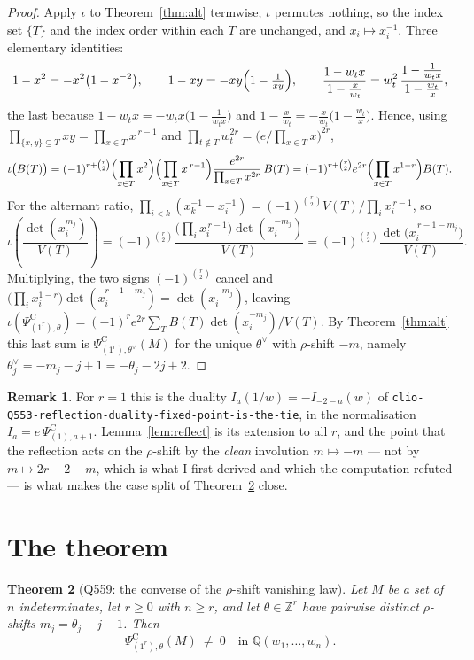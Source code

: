 \documentclass[11pt]{article}
\newtheorem{theorem}{Theorem}
\theoremstyle{definition}
\newtheorem{remark}[theorem]{Remark}
\newcommand{\PsiC}{\Psi^{\mathrm{C}}}
\begin{document}
\begin{proof}
Apply $\iota$ to Theorem~\ref{thm:alt} termwise; $\iota$ permutes nothing, so the index set
$\{T\}$ and the index order within each $T$ are unchanged, and $x_i\mapsto x_i^{-1}$.
Three elementary identities:
\[
  1-x^{2}=-x^{2}\bigl(1-x^{-2}\bigr),\qquad
  1-xy=-xy\Bigl(1-\tfrac{1}{xy}\Bigr),\qquad
  \frac{1-w_tx}{1-\frac{x}{w_t}}=w_t^{2}\,\frac{1-\frac{1}{w_tx}}{1-\frac{w_t}{x}},
\]
the last because $1-w_tx=-w_tx\bigl(1-\frac{1}{w_tx}\bigr)$ and
$1-\frac{x}{w_t}=-\frac{x}{w_t}\bigl(1-\frac{w_t}{x}\bigr)$. Hence, using
$\prod_{\{x,y\}\subseteq T}xy=\prod_{x\in T}x^{\,r-1}$ and
$\prod_{t\notin T}w_t^{2r}=\bigl(e/\prod_{x\in T}x\bigr)^{2r}$,
\[
  \iota\bigl(B(T)\bigr)
  =(-1)^{r+\binom r2}\Bigl(\prod_{x\in T}x^{2}\Bigr)\Bigl(\prod_{x\in T}x^{\,r-1}\Bigr)
   \frac{e^{2r}}{\prod_{x\in T}x^{2r}}\,B(T)
  =(-1)^{r+\binom r2}e^{2r}\Bigl(\prod_{x\in T}x^{1-r}\Bigr)B(T).
\]
For the alternant ratio,
$\prod_{i<k}(x_k^{-1}-x_i^{-1})=(-1)^{\binom r2}V(T)\big/\prod_i x_i^{\,r-1}$, so
\[
  \iota\!\left(\frac{\det(x_i^{m_j})}{V(T)}\right)
  =(-1)^{\binom r2}\frac{\bigl(\prod_ix_i^{\,r-1}\bigr)\det(x_i^{-m_j})}{V(T)}
  =(-1)^{\binom r2}\frac{\det\bigl(x_i^{\,r-1-m_j}\bigr)}{V(T)} .
\]
Multiplying, the two signs $(-1)^{\binom r2}$ cancel and
$\bigl(\prod_ix_i^{1-r}\bigr)\det(x_i^{r-1-m_j})=\det(x_i^{-m_j})$, leaving
$\iota(\PsiC_{(1^r),\theta})=(-1)^re^{2r}\sum_TB(T)\det(x_i^{-m_j})/V(T)$. By
Theorem~\ref{thm:alt} this last sum is $\PsiC_{(1^r),\theta^\vee}(M)$ for the unique
$\theta^\vee$ with $\rho$-shift $-m$, namely $\theta^\vee_j=-m_j-j+1=-\theta_j-2j+2$.
\end{proof}

\begin{remark}
For $r=1$ this is the duality $I_a(1/w)=-I_{-2-a}(w)$ of
\texttt{clio-Q553-reflection-duality-fixed-point-is-the-tie}, in the normalisation
$I_a=e\,\PsiC_{(1),a+1}$. Lemma~\ref{lem:reflect} is its extension to all $r$, and the
point that the reflection acts on the $\rho$-shift by the \emph{clean} involution
$m\mapsto-m$ --- not by $m\mapsto 2r-2-m$, which is what I first derived and which the
computation refuted --- is what makes the case split of Theorem~\ref{thm:main} close.
\end{remark}

\section{The theorem}

\begin{theorem}[Q559: the converse of the $\rho$-shift vanishing law]\label{thm:main}
Let $M$ be a set of $n$ indeterminates, let $r\ge0$ with $n\ge r$, and let
$\theta\in\mathbb{Z}^r$ have pairwise distinct $\rho$-shifts $m_j=\theta_j+j-1$. Then
\[
  \PsiC_{(1^r),\theta}(M)\ \ne\ 0 \quad\text{in } \mathbb{Q}(w_1,\dots,w_n).
\]
\end{theorem}
\end{document}

